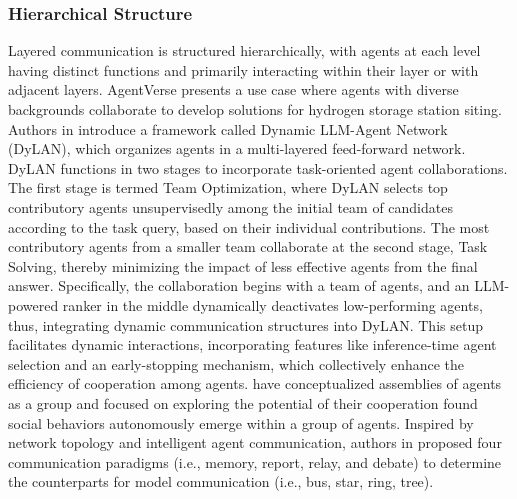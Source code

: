 \documentclass[acmsmall,nonacm]{acmart}
\begin{document}
        \subsubsection{Hierarchical Structure}
        Layered communication is structured hierarchically, with agents at each level having distinct functions and primarily interacting within their layer or with adjacent layers. 
        AgentVerse \cite{chen2024agentverse} presents a use case where agents with diverse backgrounds collaborate to develop solutions for hydrogen storage station siting.
        Authors in \cite{liu2024a} introduce a framework called Dynamic LLM-Agent Network (DyLAN), which organizes agents in a multi-layered feed-forward network.
        DyLAN functions in two stages to incorporate task-oriented agent collaborations. The first stage is termed Team Optimization, where DyLAN selects top contributory agents unsupervisedly among the initial team of candidates according to the task query, based on their individual contributions. The most contributory agents from a smaller team collaborate at the second stage, Task Solving, thereby minimizing the impact of less effective agents from the final answer. Specifically, the collaboration begins with a team of agents, and an LLM-powered ranker in the middle dynamically deactivates low-performing agents, thus, integrating dynamic communication structures into DyLAN. 
        This setup facilitates dynamic interactions, incorporating features like inference-time agent selection and an early-stopping mechanism, which collectively enhance the efficiency of cooperation among agents.
        \cite{li2023camel} have conceptualized assemblies of agents as a group and focused on exploring the potential of their cooperation
        \cite{du2023improvingfactualityreasoninglanguage, wang-etal-2024-unleashing, qian-etal-2024-chatdev, chan2024chateval} found social behaviors autonomously emerge within a group of agents. 
        Inspired by network topology and intelligent agent communication, authors in \cite{yin-etal-2023-exchange} proposed four communication paradigms (i.e., memory, report, relay, and debate) to determine the counterparts for model communication (i.e., bus, star, ring, tree).
        
\end{document}
